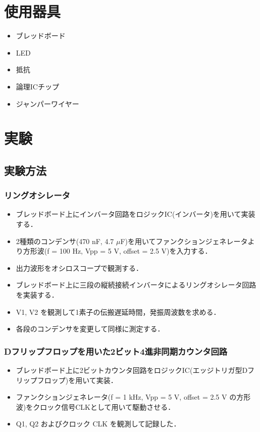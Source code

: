 \documentclass{ltjsarticle}
\begin{document}
\section{使用器具}
\begin{itemize}
  \item ブレッドボード
  \item LED
  \item 抵抗
  \item 論理ICチップ
  \item ジャンパーワイヤー
\end{itemize}

\section{実験}
\subsection{実験方法}
\subsubsection{リングオシレータ}
\begin{itemize}
  \item ブレッドボード上にインバータ回路をロジックIC(インバータ)を用いて実装する．
  \item 2種類のコンデンサ(470 nF, 4.7 $\mu$F)を用いてファンクションジェネレータより方形波(f = 100 Hz, Vpp = 5 V, offset = 2.5 V)を入力する．
  \item 出力波形をオシロスコープで観測する．
\end{itemize}

\begin{itemize}
  \item ブレッドボード上に三段の縦続接続インバータによるリングオシレータ回路を実装する．
  \item V1, V2 を観測して1素子の伝搬遅延時間，発振周波数を求める．
  \item 各段のコンデンサを変更して同様に測定する．
\end{itemize}

\subsubsection{Dフリップフロップを用いた2ビット4進非同期カウンタ回路}
\begin{itemize}
  \item ブレッドボード上に2ビットカウンタ回路をロジックIC(エッジトリガ型Dフリップフロップ)を用いて実装．
  \item ファンクションジェネレータ(f = 1 kHz, Vpp = 5 V, offset = 2.5 V の方形波)をクロック信号CLKとして用いて駆動させる．
  \item Q1, Q2 およびクロック CLK を観測して記録した．
\end{itemize}
\end{document}
